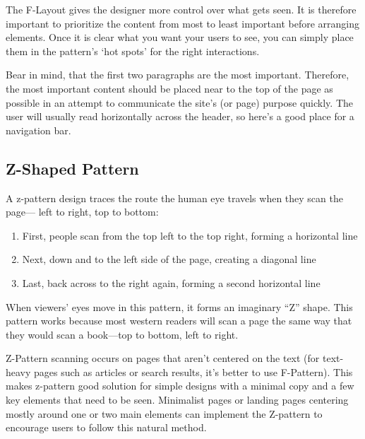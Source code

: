 The F-Layout gives the designer more control over what gets seen.
It is therefore important to prioritize the content from most to least important before arranging elements. Once it is clear what you want your users to see, you can simply place them in the pattern’s ‘hot spots’ for the right interactions.

Bear in mind, that the first two paragraphs are the most important. 
Therefore, the most important content should be placed near to the top of the page as possible in an attempt to communicate the site’s (or page) purpose quickly. The user will usually read horizontally across the header, so here’s a good place for a navigation bar.


\subsection{Z-Shaped Pattern} %
\label{sub:z_shaped_pattern}

A z-pattern design traces the route the human eye travels when they scan the page— left to right, top to bottom:
\begin{enumerate}
	\item First, people scan from the top left to the top right, forming a horizontal line
	\item Next, down and to the left side of the page, creating a diagonal line
	\item Last, back across to the right again, forming a second horizontal line
\end{enumerate}
When viewers’ eyes move in this pattern, it forms an imaginary ``Z'' shape.
This pattern works because most western readers will scan a page the same way that they would scan a book---top to bottom, left to right.

Z-Pattern scanning occurs on pages that aren’t centered on the text (for text-heavy pages such as articles or search results, it’s better to use F-Pattern). This makes z-pattern good solution for simple designs with a minimal copy and a few key elements that need to be seen. Minimalist pages or landing pages centering mostly around one or two main elements can implement the Z-pattern to encourage users to follow this natural method.

